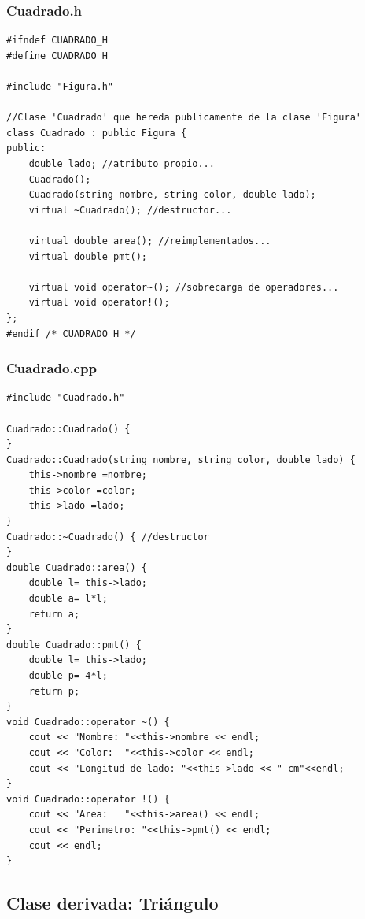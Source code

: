 \documentclass[11pt]{article}
\begin{document}
\subsubsection*{Cuadrado.h}
\begin{lstlisting}
#ifndef CUADRADO_H
#define CUADRADO_H

#include "Figura.h"

//Clase 'Cuadrado' que hereda publicamente de la clase 'Figura'
class Cuadrado : public Figura {	
public:
	double lado; //atributo propio...
	Cuadrado();
	Cuadrado(string nombre, string color, double lado);
	virtual ~Cuadrado(); //destructor...
	
	virtual double area(); //reimplementados...
	virtual double pmt();
	
	virtual void operator~(); //sobrecarga de operadores...
	virtual void operator!();
};
#endif /* CUADRADO_H */
\end{lstlisting}
\vspace{1 em}
\subsubsection*{Cuadrado.cpp}
\begin{lstlisting}
#include "Cuadrado.h"

Cuadrado::Cuadrado() {	
}
Cuadrado::Cuadrado(string nombre, string color, double lado) {
	this->nombre =nombre;
	this->color =color;
	this->lado =lado;		
}
Cuadrado::~Cuadrado() { //destructor
}
double Cuadrado::area() {
	double l= this->lado;
	double a= l*l;
	return a;
}
double Cuadrado::pmt() {
	double l= this->lado;
	double p= 4*l;
	return p;
}
void Cuadrado::operator ~() {
	cout << "Nombre: "<<this->nombre << endl;
	cout << "Color:  "<<this->color << endl;
	cout << "Longitud de lado: "<<this->lado << " cm"<<endl;
}
void Cuadrado::operator !() { 
	cout << "Area:   "<<this->area() << endl;
	cout << "Perimetro: "<<this->pmt() << endl;
	cout << endl;
}

\end{lstlisting}
\vspace{2 em}

\subsection{Clase derivada: Triángulo}
\end{document}

